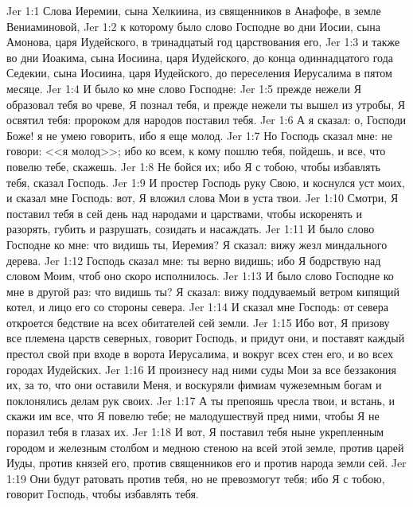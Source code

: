 \vs Jer 1:1 Слова Иеремии, сына Хелкиина, из священников в Анафофе, в земле Вениаминовой,
\vs Jer 1:2 к которому было слово Господне во дни Иосии, сына Амонова, царя Иудейского, в тринадцатый год царствования его,
\vs Jer 1:3 и также во дни Иоакима, сына Иосиина, царя Иудейского, до конца одиннадцатого года Седекии, сына Иосиина, царя Иудейского, до переселения Иерусалима в пятом месяце.
\rsbpar\vs Jer 1:4 И было ко мне слово Господне:
\vs Jer 1:5 прежде нежели Я образовал тебя во чреве, Я познал тебя, и прежде нежели ты вышел из утробы, Я освятил тебя: пророком для народов поставил тебя.
\vs Jer 1:6 А я сказал: о, Господи Боже! я не умею говорить, ибо я еще молод.
\vs Jer 1:7 Но Господь сказал мне: не говори: <<я молод>>; ибо ко всем, к кому пошлю тебя, пойдешь, и все, что повелю тебе, скажешь.
\vs Jer 1:8 Не бойся их; ибо Я с тобою, чтобы избавлять тебя, сказал Господь.
\vs Jer 1:9 И простер Господь руку Свою, и коснулся уст моих, и сказал мне Господь: вот, Я вложил слова Мои в уста твои.
\vs Jer 1:10 Смотри, Я поставил тебя в сей день над народами и царствами, чтобы искоренять и разорять, губить и разрушать, созидать и насаждать.
\rsbpar\vs Jer 1:11 И было слово Господне ко мне: что видишь ты, Иеремия? Я сказал: вижу жезл миндального дерева.
\vs Jer 1:12 Господь сказал мне: ты верно видишь; ибо Я бодрствую над словом Моим, чтоб оно скоро исполнилось.
\rsbpar\vs Jer 1:13 И было слово Господне ко мне в другой раз: что видишь ты? Я сказал: вижу поддуваемый ветром кипящий котел, и лицо его со стороны севера.
\vs Jer 1:14 И сказал мне Господь: от севера откроется бедствие на всех обитателей сей земли.
\vs Jer 1:15 Ибо вот, Я призову все племена царств северных, говорит Господь, и придут они, и поставят каждый престол свой при входе в ворота Иерусалима, и вокруг всех стен его, и во всех городах Иудейских.
\vs Jer 1:16 И произнесу над ними суды Мои за все беззакония их, за то, что они оставили Меня, и воскуряли фимиам чужеземным богам и поклонялись делам рук своих.
\vs Jer 1:17 А ты препояшь чресла твои, и встань, и скажи им все, что Я повелю тебе; не малодушествуй пред ними, чтобы Я не поразил тебя в глазах их.
\vs Jer 1:18 И вот, Я поставил тебя ныне укрепленным городом и железным столбом и медною стеною на всей этой земле, против царей Иуды, против князей его, против священников его и против народа земли сей.
\vs Jer 1:19 Они будут ратовать против тебя, но не превозмогут тебя; ибо Я с тобою, говорит Господь, чтобы избавлять тебя.
